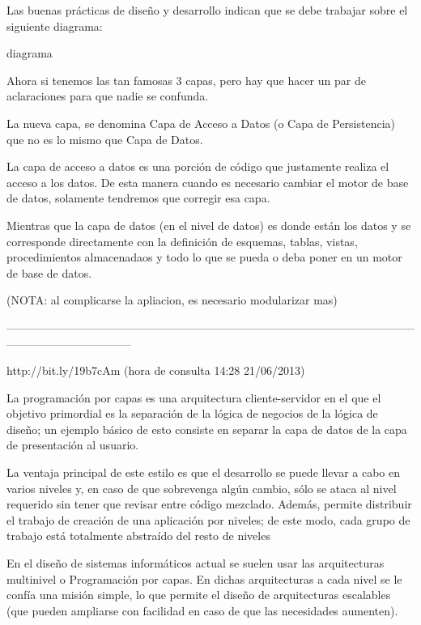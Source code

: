 Las buenas prácticas de diseño y desarrollo indican que se debe trabajar sobre el siguiente diagrama:

diagrama

Ahora si tenemos las tan famosas 3 capas, pero hay que hacer un par de aclaraciones para que nadie se confunda.

La nueva capa, se denomina Capa de Acceso a Datos (o Capa de Persistencia) que no es lo mismo que Capa de Datos.

 

La capa de acceso a datos es una porción de código que justamente realiza el acceso a los datos. De esta manera cuando es necesario 
cambiar el motor de base de datos, solamente tendremos que corregir esa capa.

 

Mientras que la capa de datos (en el nivel de datos) es donde están los datos y se corresponde directamente con la definición de 
esquemas, tablas, vistas, procedimientos almacenadaos y todo lo que se pueda o deba poner en un motor de base de datos. 

(NOTA: al complicarse la apliacion, es necesario modularizar mas)

---------------------------------------------------------------------------------------------------------------------------------------------

http://bit.ly/19b7cAm (hora de consulta 14:28 21/06/2013)

La programación por capas es una arquitectura cliente-servidor en el que el objetivo primordial es la separación de la lógica de negocios de 
la lógica de diseño; un ejemplo básico de esto consiste en separar la capa de datos de la capa de presentación al usuario.

La ventaja principal de este estilo es que el desarrollo se puede llevar a cabo en varios niveles y, en caso de que sobrevenga algún 
cambio, sólo se ataca al nivel requerido sin tener que revisar entre código mezclado. 
Además, permite distribuir el trabajo de creación de una aplicación por niveles; de este modo, cada grupo de trabajo está totalmente 
abstraído del resto de niveles

En el diseño de sistemas informáticos actual se suelen usar las arquitecturas multinivel o Programación por capas. En dichas arquitecturas 
a cada nivel se le confía una misión simple, lo que permite el diseño de arquitecturas escalables (que pueden ampliarse con facilidad en 
caso de que las necesidades aumenten).

